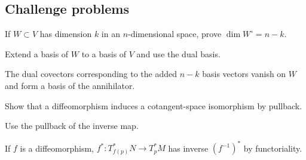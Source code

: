 \subsection*{Challenge problems}

\begin{exercise}\label{exr:vii05-ped-15}
If \(W\subset V\) has dimension \(k\) in an \(n\)-dimensional space, prove \(\dim W^\circ=n-k\).
\end{exercise}
\begin{hint}
Extend a basis of \(W\) to a basis of \(V\) and use the dual basis.
\end{hint}
\begin{solution}
The dual covectors corresponding to the added \(n-k\) basis vectors vanish on \(W\) and form a basis of the annihilator.
\end{solution}

\begin{exercise}\label{exr:vii05-ped-16}
Show that a diffeomorphism induces a cotangent-space isomorphism by pullback.
\end{exercise}
\begin{hint}
Use the pullback of the inverse map.
\end{hint}
\begin{solution}
If \(f\) is a diffeomorphism, \(f^*:T^*_{f(p)}N\to T_p^*M\) has inverse \((f^{-1})^*\) by functoriality.
\end{solution}

